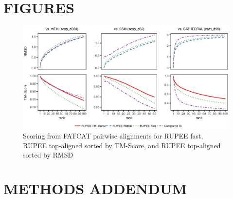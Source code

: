 \documentclass[letter,center,fleqn]{NAR}
\begin{document}
\onecolumn
\section{FIGURES}

\begin{figure}[h!]
\begin{center}
\includegraphics{combined_scoring_fatcat}
\end{center}
\caption{Scoring from FATCAT pairwise alignments for RUPEE fast, RUPEE top-aligned sorted by TM-Score, and RUPEE top-aligned sorted by RMSD}
\label{fig:combined_scoring_fatcat}
\end{figure}

\newpage

\section{METHODS ADDENDUM}
\end{document}
